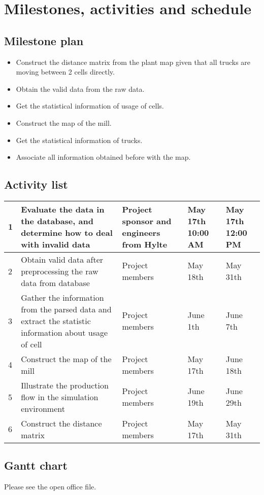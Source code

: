 \documentclass{report}
\begin{document}
\section{Milestones, activities and schedule}
\subsection{Milestone plan}
	\begin{itemize}
	\item
	Construct the distance matrix from the plant map given that all trucks are moving between 2 cells directly.
	\item
	Obtain the valid data from the raw data.
	\item
	Get the statistical information of usage of cells.
	\item
	Construct the map of the mill.
	\item
	Get the statistical information of trucks.
	\item
	Associate all information obtained before with the map.
	\end{itemize}
	
\subsection{Activity list}
	\begin{table}[h]
	\begin{tabular}{|m{0.1cm} | m{5cm} | m{5cm} | m{1.5cm} | m{1.5cm} |}
	\hline
	1 & Evaluate the data in the database, and determine how to deal with invalid data  & Project sponsor and engineers from Hylte & May 17th 10:00 AM 
	& May 17th 12:00 PM \\
	\hline
	2 & Obtain valid data after preprocessing the raw data from database & Project members & May 18th & May 31th \\
	\hline
	3 & Gather the information from the parsed data and extract the statistic information about usage of cell & Project members & June 1th & June 7th 
	\\
	\hline
	4 & Construct the map of the mill & Project members & May 17th & June 18th \\
	\hline
	5 & Illustrate the production flow in the simulation environment & Project members & June 19th & June 29th \\
	\hline
	6 & Construct the distance matrix & Project members & May 17th & May 31th \\
	\hline
	
	\end{tabular}
	\end{table}

\subsection{Gantt chart}
Please see the open office file.
\end{document}
